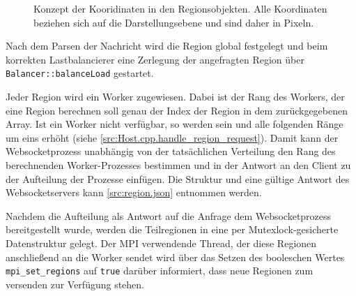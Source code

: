 \begin{figure}
	
\end{figure}

\begin{figure}
    \caption{Konzept der Kooridinaten in den Regionsobjekten. Alle Koordinaten beziehen sich auf die Darstellungsebene und sind daher in Pixeln.}
    \label{fig:concept_coordinates}
\end{figure}


Nach dem Parsen der Nachricht wird die Region global festgelegt und beim korrekten Lastbalancierer eine Zerlegung der angefragten Region über \verb|Balancer::balanceLoad| gestartet.

Jeder Region wird ein Worker zugewiesen.
Dabei ist der Rang des Workers, der eine Region berechnen soll genau der Index der Region in dem zurückgegebenen Array.
Ist ein Worker nicht verfügbar, so werden sein und alle folgenden Ränge um eins erhöht (siehe \autoref{src:Host.cpp.handle_region_request}).
Damit kann der Websocketprozess unabhängig von der tatsächlichen Verteilung den Rang des berechnenden Worker-Prozesses
bestimmen und in der Antwort an den Client zu der Aufteilung der Prozesse einfügen.
Die Struktur und eine gültige Antwort des Websocketservers kann \autoref{src:region.json} entnommen werden.

Nachdem die Aufteilung als Antwort auf die Anfrage dem Websocketprozess bereitgestellt wurde, werden die Teilregionen in eine per Mutexlock-gesicherte Datenstruktur
gelegt. Der MPI verwendende Thread, der diese Regionen anschließend an die Worker sendet wird über das Setzen des booleschen Wertes \verb|mpi_set_regions|
auf \verb|true| darüber informiert, dass neue Regionen zum versenden zur Verfügung stehen.

